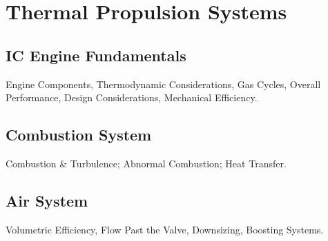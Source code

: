 \chapter{Thermal Propulsion Systems}
\section{IC Engine Fundamentals}
Engine Components, Thermodynamic Considerations, Gas Cycles, Overall Performance,
Design Considerations, Mechanical Efficiency.
\section{Combustion System}
Combustion \& Turbulence; Abnormal Combustion; Heat Transfer.
\section{Air System}
Volumetric Efficiency, Flow Past the Valve, Downsizing, Boosting Systems.

